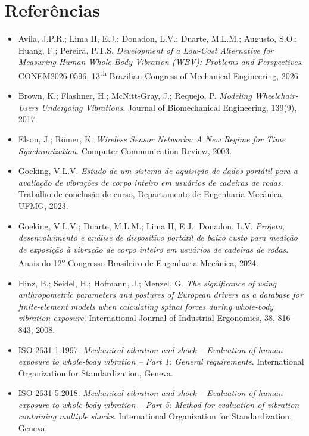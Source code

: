 \documentclass[11pt,a4paper]{article}
\begin{document}
\section*{Referências}
\begin{itemize}
\item Avila, J.P.R.; Lima II, E.J.; Donadon, L.V.; Duarte, M.L.M.; Augusto,
S.O.; Huang, F.; Pereira, P.T.S. \emph{Development of a Low-Cost
Alternative for Measuring Human Whole-Body Vibration (WBV): Problems and
Perspectives}. CONEM2026-0596, 13\textsuperscript{th} Brazilian Congress
of Mechanical Engineering, 2026.
\item Brown, K.; Flashner, H.; McNitt-Gray, J.; Requejo, P. \emph{Modeling
Wheelchair-Users Undergoing Vibrations}. Journal of Biomechanical
Engineering, 139(9), 2017.
\item Elson, J.; Römer, K. \emph{Wireless Sensor Networks: A New Regime
for Time Synchronization}. Computer Communication Review, 2003.
\item Goeking, V.L.V. \emph{Estudo de um sistema de aquisição de dados
portátil para a avaliação de vibrações de corpo inteiro em usuários de
cadeiras de rodas}. Trabalho de conclusão de curso, Departamento de
Engenharia Mecânica, UFMG, 2023.
\item Goeking, V.L.V.; Duarte, M.L.M.; Lima II, E.J.; Donadon, L.V.
\emph{Projeto, desenvolvimento e análise de dispositivo portátil de
baixo custo para medição de exposição à vibração de corpo inteiro em
usuários de cadeiras de rodas}. Anais do 12\textsuperscript{o} Congresso
Brasileiro de Engenharia Mecânica, 2024.
\item Hinz, B.; Seidel, H.; Hofmann, J.; Menzel, G. \emph{The significance
of using anthropometric parameters and postures of European drivers as a
database for finite-element models when calculating spinal forces during
whole-body vibration exposure}. International Journal of Industrial
Ergonomics, 38, 816--843, 2008.
\item ISO 2631-1:1997. \emph{Mechanical vibration and shock -- Evaluation
of human exposure to whole-body vibration -- Part 1: General
requirements}. International Organization for Standardization, Geneva.
\item ISO 2631-5:2018. \emph{Mechanical vibration and shock -- Evaluation
of human exposure to whole-body vibration -- Part 5: Method for
evaluation of vibration containing multiple shocks}. International
Organization for Standardization, Geneva.
\end{itemize}
\end{document}
